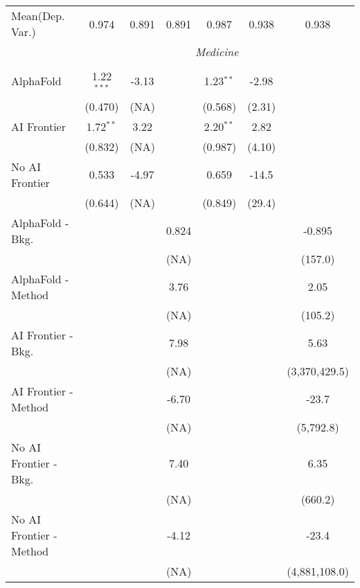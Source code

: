 \begin{tabular}{lcccccc}
Mean(Dep. Var.) & 0.974 & 0.891 & 0.891 & 0.987 & 0.938 & 0.938 \\
 & \multicolumn{6}{c}{\textit{Medicine}} \\ \\
   AlphaFold               & 1.22$^{***}$ & -3.13 &       & 1.23$^{**}$ & -2.98  &   \\   
                           & (0.470)      & (NA)  &       & (0.568)     & (2.31) &   \\   
   AI Frontier             & 1.72$^{**}$  & 3.22  &       & 2.20$^{**}$ & 2.82   &   \\   
                           & (0.832)      & (NA)  &       & (0.987)     & (4.10) &   \\   
   No AI Frontier          & 0.533        & -4.97 &       & 0.659       & -14.5  &   \\   
                           & (0.644)      & (NA)  &       & (0.849)     & (29.4) &   \\   
   AlphaFold - Bkg.        &              &       & 0.824 &             &        & -0.895\\   
                           &              &       & (NA)  &             &        & (157.0)\\   
   AlphaFold - Method      &              &       & 3.76  &             &        & 2.05\\   
                           &              &       & (NA)  &             &        & (105.2)\\   
   AI Frontier - Bkg.      &              &       & 7.98  &             &        & 5.63\\   
                           &              &       & (NA)  &             &        & (3,370,429.5)\\   
   AI Frontier - Method    &              &       & -6.70 &             &        & -23.7\\   
                           &              &       & (NA)  &             &        & (5,792.8)\\   
   No AI Frontier - Bkg.   &              &       & 7.40  &             &        & 6.35\\   
                           &              &       & (NA)  &             &        & (660.2)\\   
   No AI Frontier - Method &              &       & -4.12 &             &        & -23.4\\   
                           &              &       & (NA)  &             &        & (4,881,108.0)\\   

\end{tabular}
